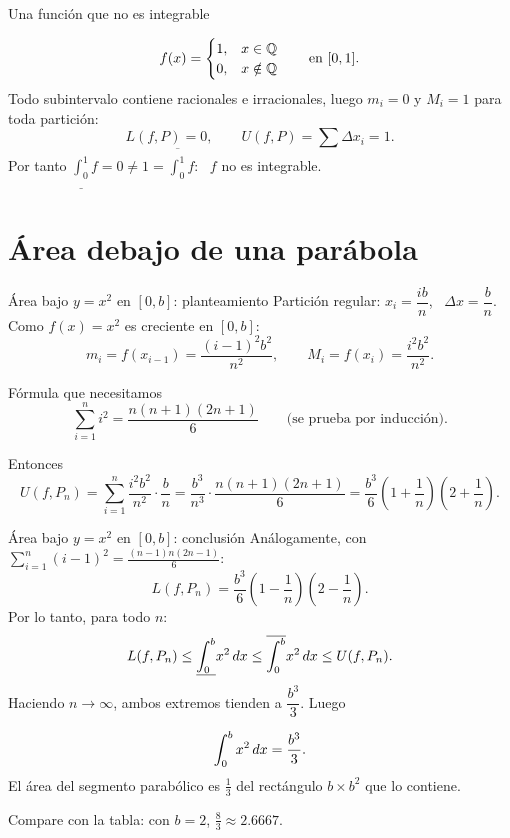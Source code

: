 \documentclass[10pt,aspectratio=169]{beamer}
\begin{document}
\begin{frame}{Una función que no es integrable}
  \begin{ejemplo}
    \[ f(x)=\begin{cases}1,&x\in\mathbb{Q}\\0,&x\notin\mathbb{Q}\end{cases}\qquad\text{en }[0,1]. \]
    Todo subintervalo contiene racionales e irracionales, luego $m_i=0$ y $M_i=1$ para toda partición:
    \[ L(f,P)=0,\qquad U(f,P)=\sum\Delta x_i=1. \]
    Por tanto $\underline{\int_0^1}f=0\ne1=\overline{\int_0^1}f$: \ $f$ \alert{no es integrable}.
  \end{ejemplo}
  \begin{center}
  \end{center}
\end{frame}

\section{Área debajo de una parábola}

\begin{frame}{Área bajo $y=x^2$ en $[0,b]$: planteamiento}
  Partición regular: $x_i=\dfrac{ib}{n}$, \ $\Delta x=\dfrac bn$. Como $f(x)=x^2$ es creciente en $[0,b]$:
  \[ m_i=f(x_{i-1})=\frac{(i-1)^2b^2}{n^2},\qquad M_i=f(x_i)=\frac{i^2b^2}{n^2}. \]
  \begin{block}{Fórmula que necesitamos}
    \[ \sum_{i=1}^n i^2=\frac{n(n+1)(2n+1)}{6} \qquad\text{(se prueba por inducción).} \]
  \end{block}
  Entonces
  \[ U(f,P_n)=\sum_{i=1}^n\frac{i^2b^2}{n^2}\cdot\frac bn=\frac{b^3}{n^3}\cdot\frac{n(n+1)(2n+1)}{6}
    =\frac{b^3}{6}\left(1+\frac1n\right)\left(2+\frac1n\right). \]
\end{frame}

\begin{frame}{Área bajo $y=x^2$ en $[0,b]$: conclusión}
  Análogamente, con $\sum_{i=1}^{n}(i-1)^2=\frac{(n-1)n(2n-1)}{6}$:
  \[ L(f,P_n)=\frac{b^3}{6}\left(1-\frac1n\right)\left(2-\frac1n\right). \]
  Por lo tanto, para todo $n$:
  \[ L(f,P_n)\le\underline{\int_0^b}x^2\,dx\le\overline{\int_0^b}x^2\,dx\le U(f,P_n). \]
  Haciendo $n\to\infty$, ambos extremos tienden a $\dfrac{b^3}{3}$. Luego
  \begin{teorema}
    \[ \int_0^b x^2\,dx=\frac{b^3}{3}. \]
    El área del segmento parabólico es $\tfrac13$ del rectángulo $b\times b^2$ que lo contiene.
  \end{teorema}
  \small Compare con la tabla: con $b=2$, $\frac83\approx2.6667$. \checkmark
\end{frame}
\end{document}
